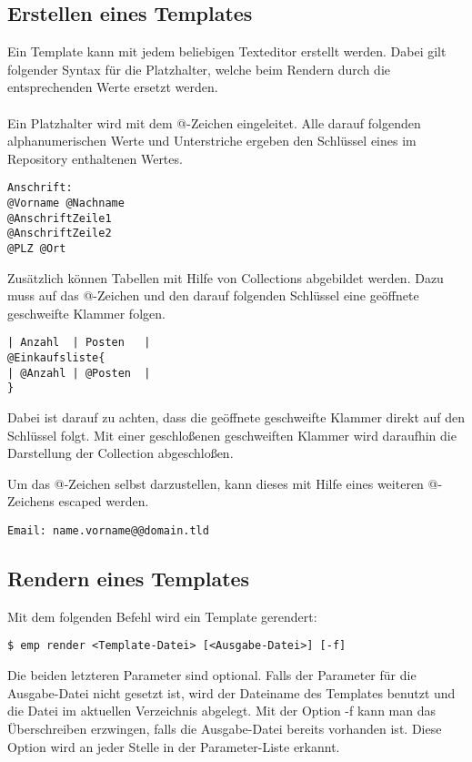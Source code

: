 \subsection{Erstellen eines Templates}
Ein Template kann mit jedem beliebigen Texteditor erstellt werden. Dabei gilt folgender Syntax für die Platzhalter, welche beim Rendern durch die entsprechenden Werte ersetzt werden.
\\\\
Ein Platzhalter wird mit dem @-Zeichen eingeleitet. Alle darauf folgenden alphanumerischen Werte und Unterstriche ergeben den Schlüssel eines im Repository enthaltenen Wertes.
\vspace{0.5em}
\begin{lstlisting}[style=Bash]
Anschrift:
@Vorname @Nachname
@AnschriftZeile1
@AnschriftZeile2
@PLZ @Ort
\end{lstlisting}

Zusätzlich können Tabellen mit Hilfe von Collections abgebildet werden. Dazu muss auf das @-Zeichen und den darauf folgenden Schlüssel eine geöffnete geschweifte Klammer folgen.
\vspace{0.5em}
\begin{lstlisting}[style=Bash]
| Anzahl  | Posten   |
@Einkaufsliste{
| @Anzahl | @Posten  |
}
\end{lstlisting}

Dabei ist darauf zu achten, dass die geöffnete geschweifte Klammer direkt auf den Schlüssel folgt. Mit einer geschloßenen geschweiften Klammer wird daraufhin die Darstellung der Collection abgeschloßen.

Um das @-Zeichen selbst darzustellen, kann dieses mit Hilfe eines weiteren @-Zeichens escaped werden.

\begin{lstlisting}[style=Bash]
Email: name.vorname@@domain.tld
\end{lstlisting}

\subsection{Rendern eines Templates}
Mit dem folgenden Befehl wird ein Template gerendert:
\begin{lstlisting}[style=Bash]
$ emp render <Template-Datei> [<Ausgabe-Datei>] [-f]
\end{lstlisting}

Die beiden letzteren Parameter sind optional. Falls der Parameter für die Ausgabe-Datei nicht gesetzt ist, wird der Dateiname des Templates benutzt und die Datei im aktuellen Verzeichnis abgelegt. Mit der Option -f kann man das Überschreiben erzwingen, falls die Ausgabe-Datei bereits vorhanden ist. Diese Option wird an jeder Stelle in der Parameter-Liste erkannt.


